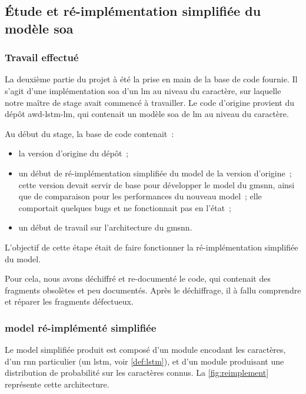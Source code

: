 \subsection{Étude et ré-implémentation simplifiée du modèle \gls{soa}}
\subsubsection{Travail effectué}
La deuxième partie du projet à été la prise en main de la base de code fournie.
Il s'agit d'une implémentation \gls{soa} d'un \gls{lm} au niveau du caractère, sur laquelle notre maître de stage avait commencé à travailler.
Le code d'origine provient du dépôt \og awd-lstm-lm\fg{}\autocite{awd_source}, qui contenait un modèle \gls{soa} de \gls{lm} au niveau du caractère.

Au début du stage, la base de code contenait~:
\begin{itemize}
	\item la version d'origine du dépôt~;
	\item un début de ré-implémentation simplifiée du \gls{model} de la version d'origine~; cette version  devait servir de base pour développer le \gls{model} du \gls{gmsnn}, ainsi que de comparaison pour les performances du nouveau \gls{model}~; elle comportait quelques \glspl{bug} et ne fonctionnait pas en l'état~;
	\item un début de travail sur l'architecture du \gls{gmsnn}.
\end{itemize}

\vspace{1em}
L'objectif de cette étape était de faire fonctionner la ré-implémentation simplifiée du \gls{model}.

Pour cela, nous avons déchiffré et re-documenté le code, qui contenait des fragments obsolètes et peu documentés.
Après le déchiffrage, il à fallu comprendre et réparer les fragments défectueux.

\newpage
\subsubsection[\Glsentrytext{model} ré-implémenté simplifiée]{\Gls{model} ré-implémenté simplifiée}
Le \gls{model} simplifiée produit est composé d'un module encodant les caractères, d'un \gls{rnn} particulier (un \gls{lstm}, voir \autoref{def:lstm}), et d'un module produisant une distribution de probabilité sur les caractères connus. La \autoref{fig:reimplement} représente cette architecture.

